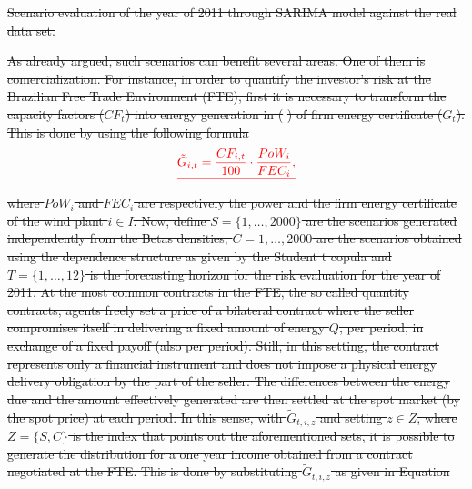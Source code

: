 \documentclass[a4paper]{IEEEtran}
\providecommand{\DIFdel}[1]{{\protect\color{red}\sout{#1}}}                      %
\begin{document}
{%
\DIFdel{Scenario evaluation of the year of 2011 through SARIMA model against the real data set.}}

\DIFdel{As already argued, such scenarios can benefit several areas. One of them is comercialization. For instance, in order to quantify the investor's risk at the Brazilian Free Trade Environment (FTE), first it is necessary to transform the capacity factors ($CF_{t}$) into energy generation in (}%
\DIFdel{) of firm energy certificate (${G}_{t}$). This is done by using the following formula
}\begin{align*}\DIFdel{
\tilde{G}_{i,t}=\frac{CF_{i,t}}{100}\cdot \frac{PoW_{i}}{FEC_{i}}, \label{eqrisk1}
}\end{align*}
\DIFdel{where $PoW_{i}$ and $FEC_{i}$ are respectively the power and the firm energy certificate of the wind plant $i\in I$.
Now, define $S=\lbrace 1,\ldots ,2000\rbrace $ are the scenarios generated independently from the Betas densities; $C={1,\ldots ,2000}$ are the scenarios obtained using the dependence structure as given by the Student t copula and $T=\lbrace 1,\ldots ,12\rbrace $ is the forecasting horizon for the risk evaluation for the year of 2011. At the most common contracts in the FTE, the so called quantity contracts, agents freely set a price of a bilateral contract where the seller compromises itself in delivering a fixed amount of energy $Q$, per period, in exchange of a fixed payoff (also per period). Still, in this setting, the contract represents only a financial instrument and does not impose a physical energy delivery obligation by the part of the seller. The differences between the energy due and the amount effectively generated are then settled at the spot market (by the spot price) at each period. In this sense, with $\tilde{G}_{t,i,z}$ and setting $z\in Z$, where $Z=\{S,C\}$ is the index that points out the aforementioned sets, it is possible to generate the distribution for a one year income obtained from a contract negotiated at the FTE. This is done by substituting $\tilde{G}_{t,i,z}$ as given in Equation }%
\end{document}
